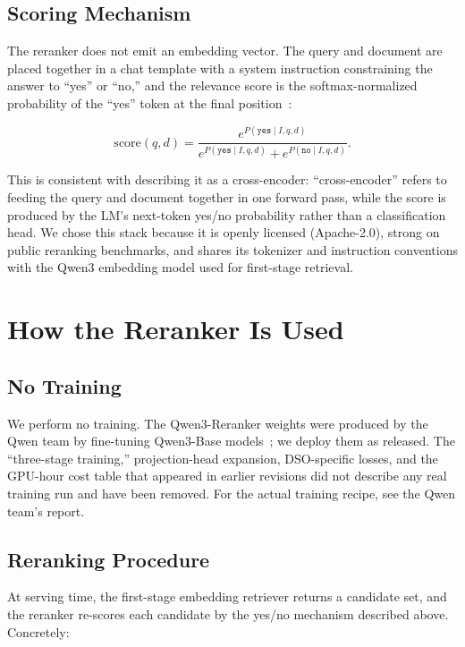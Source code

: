 \documentclass[11pt,letterpaper]{article}
\begin{document}
\subsection{Scoring Mechanism}

The reranker does not emit an embedding vector. The query and document are placed together in
a chat template with a system instruction constraining the answer to ``yes'' or ``no,'' and
the relevance score is the softmax-normalized probability of the ``yes'' token at the final
position~\cite{qwen3embedding}:

\begin{equation}
\mathrm{score}(q,d) = \frac{e^{P(\texttt{yes}\mid I,q,d)}}{e^{P(\texttt{yes}\mid I,q,d)} + e^{P(\texttt{no}\mid I,q,d)}}.
\end{equation}

This is consistent with describing it as a cross-encoder: ``cross-encoder'' refers to feeding
the query and document together in one forward pass, while the score is produced by the LM's
next-token yes/no probability rather than a classification head. We chose this stack because
it is openly licensed (Apache-2.0), strong on public reranking benchmarks, and shares its
tokenizer and instruction conventions with the Qwen3 embedding model used for first-stage
retrieval.

\section{How the Reranker Is Used}

\subsection{No Training}

We perform no training. The Qwen3-Reranker weights were produced by the Qwen team by
fine-tuning Qwen3-Base models~\cite{qwen3embedding}; we deploy them as released. The
``three-stage training,'' projection-head expansion, DSO-specific losses, and the GPU-hour
cost table that appeared in earlier revisions did not describe any real training run and
have been removed. For the actual training recipe, see the Qwen team's report.

\subsection{Reranking Procedure}

At serving time, the first-stage embedding retriever returns a candidate set, and the
reranker re-scores each candidate by the yes/no mechanism described above. Concretely:
\end{document}
